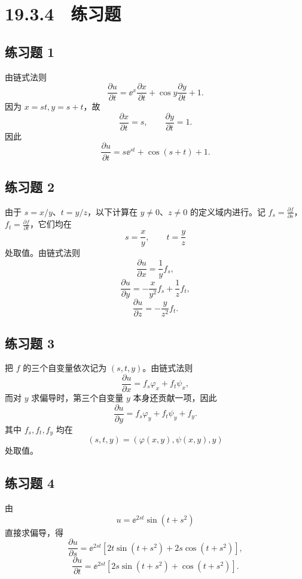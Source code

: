 \section*{19.3.4　练习题}

\subsection*{练习题 1}
\begin{xsolution}
由链式法则
\[
  \frac{\partial u}{\partial t}
  =\ee^x\frac{\partial x}{\partial t}
   +\cos y\frac{\partial y}{\partial t}+1.
\]
因为 $x=st,y=s+t$，故
\[
  \frac{\partial x}{\partial t}=s,
  \qquad
  \frac{\partial y}{\partial t}=1.
\]
因此
\[
  \boxed{\frac{\partial u}{\partial t}
  =s\ee^{st}+\cos(s+t)+1}.
\]
\end{xsolution}

\subsection*{练习题 2}
\begin{xsolution}
由于 $s=x/y$、$t=y/z$，以下计算在 $y\ne0$、$z\ne0$ 的定义域内进行。记 $f_s=\frac{\partial f}{\partial s}$，$f_t=\frac{\partial f}{\partial t}$，它们均在
\[
  s=\frac xy,
  \qquad
  t=\frac yz
\]
处取值。由链式法则
\[
  \boxed{\frac{\partial u}{\partial x}=\frac1y f_s},
\]
\[
  \boxed{\frac{\partial u}{\partial y}
  =-\frac{x}{y^2}f_s+\frac1z f_t},
\]
\[
  \boxed{\frac{\partial u}{\partial z}
  =-\frac{y}{z^2}f_t}.
\]
\end{xsolution}

\subsection*{练习题 3}
\begin{xsolution}
把 $f$ 的三个自变量依次记为 $(s,t,y)$。由链式法则
\[
  \boxed{
  \frac{\partial u}{\partial x}
  =f_s\varphi_x+f_t\psi_x},
\]
而对 $y$ 求偏导时，第三个自变量 $y$ 本身还贡献一项，因此
\[
  \boxed{
  \frac{\partial u}{\partial y}
  =f_s\varphi_y+f_t\psi_y+f_y}.
\]
其中 $f_s,f_t,f_y$ 均在
\[
  (s,t,y)=(\varphi(x,y),\psi(x,y),y)
\]
处取值。
\end{xsolution}

\subsection*{练习题 4}
\begin{xsolution}
由
\[
  u=\ee^{2st}\sin(t+s^2)
\]
直接求偏导，得
\[
  \boxed{
  \frac{\partial u}{\partial s}
  =\ee^{2st}\left[2t\sin(t+s^2)+2s\cos(t+s^2)\right]},
\]
\[
  \boxed{
  \frac{\partial u}{\partial t}
  =\ee^{2st}\left[2s\sin(t+s^2)+\cos(t+s^2)\right]}.
\]
\end{xsolution}

